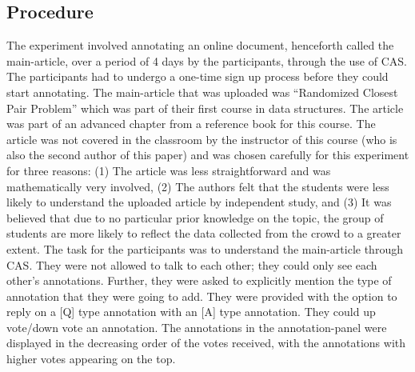 \documentclass{llncs}
\begin{document}
\subsection{Procedure}
The experiment involved annotating an online document, henceforth called the main-article, over a period of 4 days by the participants, through the use of CAS. The participants had to undergo a one-time sign up process before they could start annotating. The main-article that was uploaded was ``Randomized Closest Pair Problem'' which was part of their first course in data structures. The article was part of an advanced chapter from a reference book for this course. The article was not covered in the classroom by the instructor of this course (who is also the second author of this paper) and was chosen carefully for this experiment for three reasons: (1) The article was less straightforward and was mathematically very involved, (2) The authors felt that the students were less likely to understand the uploaded article by independent study, and (3) It was believed that due to no particular prior knowledge on the topic, the group of students are more likely to reflect the data collected from the crowd to a greater extent.
The task for the participants was to understand the main-article through CAS. They were not allowed to talk to each other; they could only see each other’s annotations. Further, they were asked to explicitly mention the type of annotation that they were going to add. They were provided with the option to reply on a [Q] type annotation with an [A] type annotation. They could up vote/down vote an annotation. The annotations in the annotation-panel were displayed in the decreasing order of the votes received, with the annotations with higher votes appearing on the top.
\end{document}
